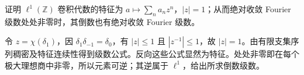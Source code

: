 \begin{exercise}\label{ex:y11-wiener-discrete}
证明 $\ell^1(\mathbb Z)$ 卷积代数的特征为 $a\mapsto\sum_n a_nz^n$，$|z|=1$；从而绝对收敛 Fourier 级数处处非零时，其倒数也有绝对收敛 Fourier 级数。
\end{exercise}
\begin{solution}
令 $z=\chi(\delta_1)$，因 $\delta_1\delta_{-1}=\delta_0$，有 $|z|\le1$ 且 $|z^{-1}|\le1$，故 $|z|=1$。由有限支集序列稠密及特征连续性得到级数公式。反向这些公式显然为特征。处处非零即在每个极大理想商中非零，所以元素可逆；其逆属于 $\ell^1$，给出所求倒数级数。
\end{solution}
